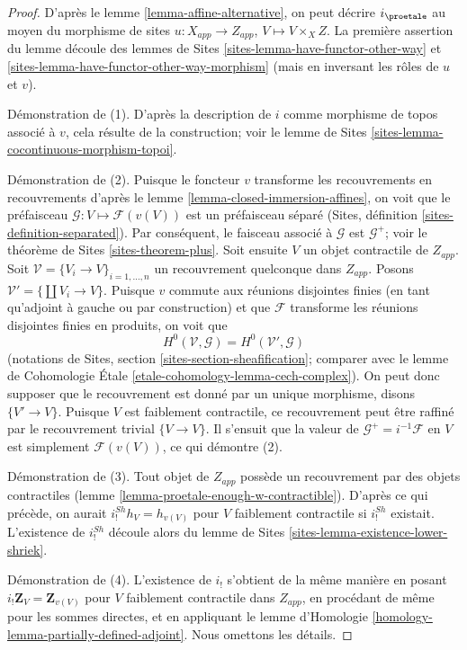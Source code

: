 \begin{proof}
D'après le lemme \ref{lemma-affine-alternative}, on peut décrire $i_\proetale$ au moyen
du morphisme de sites $u : X_{app} \to Z_{app}$, $V \mapsto V \times_X Z$.
La première assertion du lemme découle des
lemmes de Sites \ref{sites-lemma-have-functor-other-way} et
\ref{sites-lemma-have-functor-other-way-morphism}
(mais en inversant les rôles de $u$ et $v$).

\medskip\noindent
Démonstration de (1). D'après la description de $i$ comme morphisme de topos associé
à $v$, cela résulte de la construction; voir le
lemme de Sites \ref{sites-lemma-cocontinuous-morphism-topoi}.

\medskip\noindent
Démonstration de (2). Puisque le foncteur $v$ transforme les recouvrements en recouvrements d'après le
lemme \ref{lemma-closed-immersion-affines}, on voit que le préfaisceau
$\mathcal{G} : V \mapsto \mathcal{F}(v(V))$ est un préfaisceau séparé
(Sites, définition \ref{sites-definition-separated}). Par conséquent,
le faisceau associé à $\mathcal{G}$ est $\mathcal{G}^+$; voir le
théorème de Sites \ref{sites-theorem-plus}. Soit ensuite $V$ un objet
contractile de $Z_{app}$. Soit
$\mathcal{V} = \{V_i \to V\}_{i = 1, \ldots, n}$
un recouvrement quelconque dans $Z_{app}$. Posons $\mathcal{V}' = \{\coprod V_i \to V\}$.
Puisque $v$ commute aux réunions disjointes finies (en tant qu'adjoint à gauche ou par
construction) et que $\mathcal{F}$ transforme les réunions
disjointes finies en produits, on voit que
$$
H^0(\mathcal{V}, \mathcal{G}) = H^0(\mathcal{V}', \mathcal{G})
$$
(notations de Sites, section \ref{sites-section-sheafification};
comparer avec le
lemme de Cohomologie \'Etale \ref{etale-cohomology-lemma-cech-complex}).
On peut donc supposer que le recouvrement est donné par un unique morphisme, disons
$\{V' \to V\}$. Puisque $V$ est faiblement contractile, ce recouvrement
peut être raffiné par le recouvrement trivial $\{V \to V\}$.
Il s'ensuit que la valeur de $\mathcal{G}^+ = i^{-1}\mathcal{F}$
en $V$ est simplement $\mathcal{F}(v(V))$, ce qui démontre (2).

\medskip\noindent
Démonstration de (3). Tout objet de $Z_{app}$ possède un recouvrement par des objets
contractiles (lemme \ref{lemma-proetale-enough-w-contractible}).
D'après ce qui précède, on aurait $i^{Sh}_!h_V = h_{v(V)}$ pour $V$
faiblement contractile si $i^{Sh}_!$ existait. L'existence de
$i^{Sh}_!$ découle alors du
lemme de Sites \ref{sites-lemma-existence-lower-shriek}.

\medskip\noindent
Démonstration de (4). L'existence de $i_!$ s'obtient de la même manière en posant
$i_!\mathbf{Z}_V = \mathbf{Z}_{v(V)}$ pour $V$ faiblement contractile dans $Z_{app}$,
en procédant de même pour les sommes directes, et en appliquant le
lemme d'Homologie \ref{homology-lemma-partially-defined-adjoint}.
Nous omettons les détails.


\end{proof}
